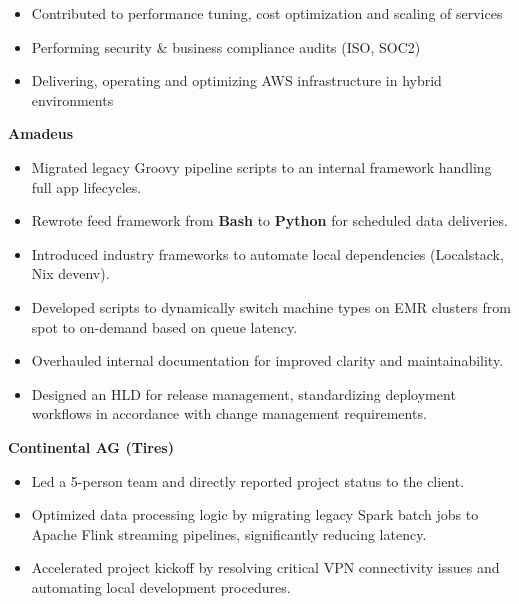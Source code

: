 
\small
\begin{itemize}[label=\tiny$\bullet$, leftmargin=1em]
	\item Contributed to performance tuning, cost optimization and scaling of services
	\item Performing security \& business compliance audits (ISO, SOC2)
	\item Delivering, operating and optimizing AWS infrastructure in hybrid environments
\end{itemize}

\vspace{3.0ex}
\small

\noindent \textbf{Amadeus}

\begin{itemize}[label=\tiny$\bullet$, leftmargin=1em]
	\item Migrated legacy Groovy pipeline scripts to an internal framework handling full app lifecycles.
	\item Rewrote feed framework from \textbf{Bash} to \textbf{Python} for scheduled data deliveries.
	\item Introduced industry frameworks to automate local dependencies (Localstack, Nix devenv).
	\item Developed scripts to dynamically switch machine types on EMR clusters from spot to on-demand based on queue latency.
	\item Overhauled internal documentation for improved clarity and maintainability.
	\item Designed an HLD for release management, standardizing deployment workflows in accordance with change management requirements.
\end{itemize}

\vspace{3.0ex}
\small

\noindent \textbf{Continental AG (Tires)}
\begin{itemize}[label=\tiny$\bullet$, leftmargin=1em, nosep]
	\item Led a 5-person team and directly reported project status to the client.
	\item Optimized data processing logic by migrating legacy Spark batch jobs to Apache Flink streaming pipelines, significantly reducing latency.
	\item Accelerated project kickoff by resolving critical VPN connectivity issues and automating local development procedures.
\end{itemize}

